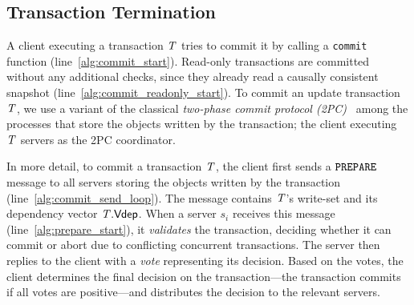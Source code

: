 \subsection{Transaction Termination}

A client executing a transaction $\mathit{T}$ tries to commit it by calling a {\tt commit} function (line~\ref{alg:commit_start}). Read-only transactions are committed without any additional checks, since they already read a causally consistent snapshot (line~\ref{alg:commit_readonly_start}). To commit an update transaction $\mathit{T}$, we use a variant of the classical \emph{two-phase commit protocol (2PC)}~\citep{bernstein_concurrency} among the processes that store the objects written by the transaction; the client executing $\mathit{T}$ servers as the 2PC coordinator.

In more detail, to commit a transaction $\mathit{T}$, the client first sends a ${\tt PREPARE}$ message to all servers storing the objects written by the transaction (line~\ref{alg:commit_send_loop}). The message contains $\mathit{T}$'s write-set and its dependency vector $\mathit{T}.\mathsf{Vdep}$. When a server $s_i$ receives this message (line~\ref{alg:prepare_start}), it \emph{validates} the transaction, deciding whether it can commit or abort due to conflicting concurrent transactions. The server then replies to the client with a \emph{vote} representing its decision. Based on the votes, the client determines the final decision on the transaction---the transaction commits if all votes are positive---and distributes the decision to the relevant servers.

